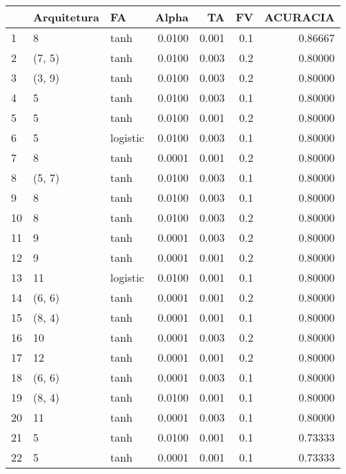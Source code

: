 \begin{tabular}{lllrrrr}
\toprule
{} & Arquitetura &        FA &   Alpha &     TA &   FV &  ACURACIA \\
\midrule
1   &           8 &      tanh &  0.0100 &  0.001 &  0.1 &   0.86667 \\
2   &      (7, 5) &      tanh &  0.0100 &  0.003 &  0.2 &   0.80000 \\
3   &      (3, 9) &      tanh &  0.0100 &  0.003 &  0.2 &   0.80000 \\
4   &           5 &      tanh &  0.0100 &  0.003 &  0.1 &   0.80000 \\
5   &           5 &      tanh &  0.0100 &  0.001 &  0.2 &   0.80000 \\
6   &           5 &  logistic &  0.0100 &  0.003 &  0.1 &   0.80000 \\
7   &           8 &      tanh &  0.0001 &  0.001 &  0.2 &   0.80000 \\
8   &      (5, 7) &      tanh &  0.0100 &  0.003 &  0.1 &   0.80000 \\
9   &           8 &      tanh &  0.0100 &  0.003 &  0.1 &   0.80000 \\
10  &           8 &      tanh &  0.0100 &  0.003 &  0.2 &   0.80000 \\
11  &           9 &      tanh &  0.0001 &  0.003 &  0.2 &   0.80000 \\
12  &           9 &      tanh &  0.0001 &  0.001 &  0.2 &   0.80000 \\
13  &          11 &  logistic &  0.0100 &  0.001 &  0.1 &   0.80000 \\
14  &      (6, 6) &      tanh &  0.0001 &  0.001 &  0.2 &   0.80000 \\
15  &      (8, 4) &      tanh &  0.0001 &  0.001 &  0.1 &   0.80000 \\
16  &          10 &      tanh &  0.0001 &  0.003 &  0.2 &   0.80000 \\
17  &          12 &      tanh &  0.0001 &  0.001 &  0.2 &   0.80000 \\
18  &      (6, 6) &      tanh &  0.0001 &  0.003 &  0.1 &   0.80000 \\
19  &      (8, 4) &      tanh &  0.0100 &  0.001 &  0.1 &   0.80000 \\
20  &          11 &      tanh &  0.0001 &  0.003 &  0.1 &   0.80000 \\
21  &           5 &      tanh &  0.0100 &  0.001 &  0.1 &   0.73333 \\
22  &           5 &      tanh &  0.0001 &  0.001 &  0.1 &   0.73333 \\

\end{tabular}
